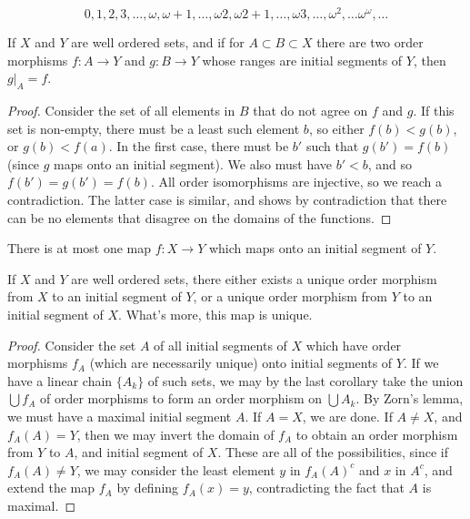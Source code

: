 \[ 0, 1, 2, 3, \dots, \omega, \omega + 1, \dots, \omega 2, \omega 2 + 1, \dots, \omega 3, \dots, \omega^2, \dots \omega^\omega, \dots  \]

\begin{lemma}
    If $X$ and $Y$ are well ordered sets, and if for $A \subset B \subset X$ there are two order morphisms $f:A \to Y$ and $g:B \to Y$ whose ranges are initial segments of $Y$, then $g|_A = f$.
\end{lemma}
\begin{proof}
    Consider the set of all elements in $B$ that do not agree on $f$ and $g$. If this set is non-empty, there must be a least such element $b$, so either $f(b) < g(b)$, or $g(b) < f(a)$. In the first case, there must be $b'$ such that $g(b') = f(b)$ (since $g$ maps onto an initial segment). We also must have $b' < b$, and so $f(b') = g(b') = f(b)$. All order isomorphisms are injective, so we reach a contradiction. The latter case is similar, and shows by contradiction that there can be no elements that disagree on the domains of the functions.
\end{proof}

\begin{corollary}
    There is at most one map $f:X \to Y$ which maps onto an initial segment of $Y$.
\end{corollary}

\begin{lemma}
    If $X$ and $Y$ are well ordered sets, there either exists a unique order morphism from $X$ to an initial segment of $Y$, or a unique order morphism from $Y$ to an initial segment of $X$. What's more, this map is unique.
\end{lemma}
\begin{proof}
    Consider the set $A$ of all initial segments of $X$ which have order morphisms $f_A$ (which are necessarily unique) onto initial segments of $Y$. If we have a linear chain $\{A_k\}$ of such sets, we may by the last corollary take the union $\bigcup f_A$ of order morphisms to form an order morphism on $\bigcup A_k$. By Zorn's lemma, we must have a maximal initial segment $A$. If $A = X$, we are done. If $A \neq X$, and $f_A(A) = Y$, then we may invert the domain of $f_A$ to obtain an order morphism from $Y$ to $A$, and initial segment of $X$. These are all of the possibilities, since if $f_A(A) \neq Y$, we may consider the least element $y$ in $f_A(A)^c$ and $x$ in $A^c$, and extend the map $f_A$ by defining $f_A(x) = y$, contradicting the fact that $A$ is maximal.
\end{proof}

